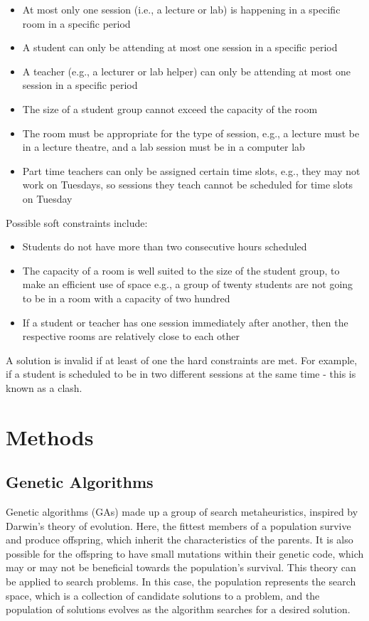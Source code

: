 \documentclass[a4paper, 12pt]{report}
\begin{document}
\begin{itemize}
	\item At most only one session (i.e., a lecture or lab) is happening in a 
		specific room in a specific period
	\item A student can only be attending at most one session in a specific 
		period
	\item A teacher (e.g., a lecturer or lab helper) can only be attending at 
		most one session in a specific period
	\item The size of a student group cannot exceed the capacity of the room
	\item The room must be appropriate for the type of session, e.g., a lecture 
		must be in a lecture theatre, and a lab session must be in a computer 
		lab
	\item Part time teachers can only be assigned certain time slots, e.g., they may not
	      work on Tuesdays, so sessions they teach cannot be scheduled for time slots on
	      Tuesday
\end{itemize}

Possible soft constraints include:

\begin{itemize}
	\item Students do not have more than two consecutive hours scheduled
	\item The capacity of a room is well suited to the size of the student group, to make
	      an efficient use of space e.g., a group of twenty students are not going to be
	      in a room with a capacity of two hundred
	\item If a student or teacher has one session immediately after another, then the
	      respective rooms are relatively close to each other
\end{itemize}
A solution is invalid if at least of one the hard constraints are met. For 
example, if a student is scheduled to be in two different sessions at the same 
time - this is known as a clash.

\section{Methods}

\subsection{Genetic Algorithms}

Genetic algorithms (GAs) made up a group of search metaheuristics, inspired by
Darwin's theory of evolution. Here, the fittest members of a population survive
and produce offspring, which inherit the characteristics of the parents. It is
also possible for the offspring to have small mutations within their genetic
code, which may or may not be beneficial towards the population's survival.
This theory can be applied to search problems. In this case, the population
represents the search space, which is a collection of candidate solutions to a
problem, and the population of solutions evolves as the algorithm searches for
a desired solution.
\end{document}
